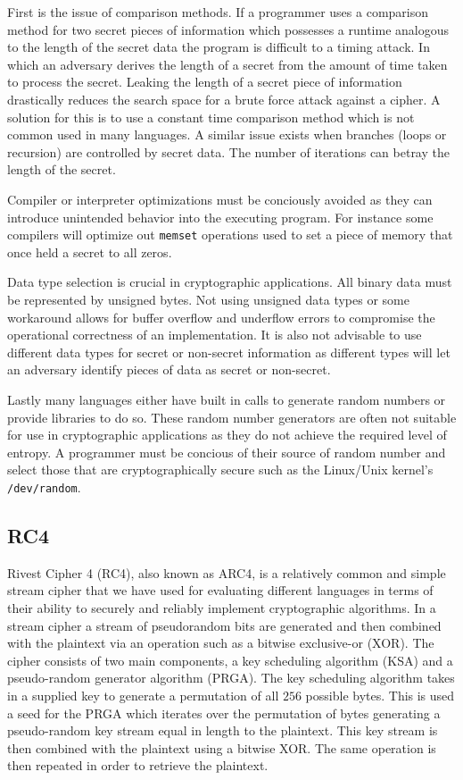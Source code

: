 First is the issue of comparison methods. If a programmer uses a comparison method for two secret pieces of information which possesses a runtime analogous to the length 
of the secret data the program is difficult to a timing attack. In which an adversary derives the length of a secret from the amount of time taken to process the secret. 
Leaking the length of a secret piece of information drastically reduces the search space for a brute force attack against a cipher. A solution for this is to use a 
constant time comparison method which is not common used in many languages. A similar issue exists when branches (loops or recursion) are controlled by secret data. The 
number of iterations can betray the length of the secret.

Compiler or interpreter optimizations must be conciously avoided as they can introduce unintended behavior into the executing program. For instance some compilers will 
optimize out \texttt{memset} operations used to set a piece of memory that once held a secret to all zeros.

Data type selection is crucial in cryptographic applications. All binary data must be represented by unsigned bytes. Not using unsigned data types or some workaround allows 
for buffer overflow and underflow errors to compromise the operational correctness of an implementation. It is also not advisable to use different data types for secret or 
non-secret information as different types will let an adversary identify pieces of data as secret or non-secret.

Lastly many languages either have built in calls to generate random numbers or provide libraries to do so. These random number generators are often not suitable for use 
in cryptographic applications as they do not achieve the required level of entropy. A programmer must be concious of their source of random number and select those that are 
cryptographically secure such as the Linux/Unix kernel's \texttt{/dev/random}.

\subsection{RC4}

Rivest Cipher 4 (RC4), also known as ARC4, is a relatively common and simple stream cipher that we have 
used for evaluating different languages in terms of their ability to securely and reliably implement 
cryptographic algorithms. In a stream cipher a stream of pseudorandom bits are generated and then combined 
with the plaintext via an operation such as a bitwise exclusive-or (XOR). The cipher consists of two main 
components, a key scheduling algorithm (KSA) and a pseudo-random generator algorithm (PRGA). The key scheduling algorithm 
takes in a supplied key to generate a permutation of all $256$ possible bytes. This is used a seed for the 
PRGA which iterates over the permutation of bytes generating a pseudo-random key stream equal in length to 
the plaintext. This key stream is then combined with the plaintext using a bitwise XOR. The same operation is 
then repeated in order to retrieve the plaintext.
